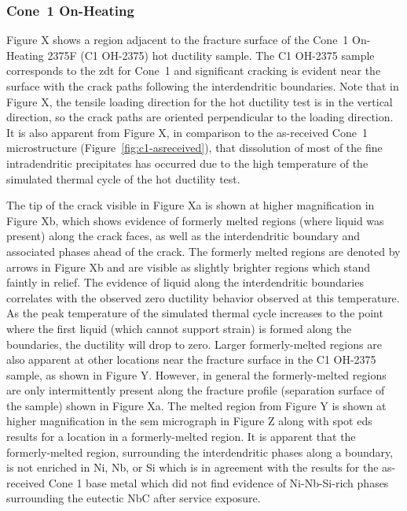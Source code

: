\subsubsection{Cone~1 On-Heating}
Figure X shows a region adjacent to the fracture surface of the Cone~1 On-Heating 2375\textdegree{}F (C1 OH-2375) hot ductility sample. The C1 OH-2375 sample corresponds to the \gls{zdt} for Cone~1 and significant cracking is evident near the surface with the crack paths following the interdendritic boundaries. Note that in Figure X, the tensile loading direction for the hot ductility test is in the vertical direction, so the crack paths are oriented perpendicular to the loading direction. It is also apparent from Figure X, in comparison to the as-received Cone~1 microstructure (Figure~\ref{fig:c1-asreceived}), that dissolution of most of the fine intradendritic precipitates has occurred due to the high temperature of the simulated thermal cycle of the hot ductility test.

The tip of the crack visible in Figure Xa is shown at higher magnification in Figure Xb, which shows evidence of formerly melted regions (where liquid was present) along the crack faces, as well as the interdendritic boundary and associated phases ahead of the crack. The formerly melted regions are denoted by arrows in Figure Xb and are visible as slightly brighter regions which stand faintly in relief. The evidence of liquid along the interdendritic boundaries correlates with the observed zero ductility behavior observed at this temperature. As the peak temperature of the simulated thermal cycle increases to the point where the first liquid (which cannot support strain) is formed along the boundaries, the ductility will drop to zero. Larger formerly-melted regions are also apparent at other locations near the fracture surface in the C1 OH-2375 sample, as shown in Figure Y. However, in general the formerly-melted regions are only intermittently present along the fracture profile (separation surface of the sample) shown in Figure Xa. The melted region from Figure Y is shown at higher magnification in the \gls{sem} micrograph in Figure Z along with spot \gls{eds} results for a location in a formerly-melted region. It is apparent that the formerly-melted region, surrounding the interdendritic phases along a boundary, is not enriched in Ni, Nb, or Si which is in agreement with the results for the as-received Cone 1 base metal which did not find evidence of Ni-Nb-Si-rich phases surrounding the eutectic NbC after service exposure.

